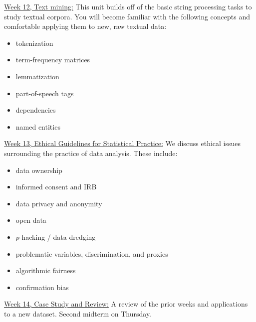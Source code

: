 \documentclass[12pt]{article}
\begin{document}
\bigskip

\underline{Week 12, Text mining:}
This unit builds off of the basic string processing tasks to study
textual corpora. You will become familiar with the following concepts
and comfortable applying them to new, raw textual data:
\begin{itemize}\setlength\itemsep{0em}
\item tokenization
\item term-frequency matrices
\item lemmatization
\item part-of-speech tags
\item dependencies
\item named entities
\end{itemize}

\bigskip

\underline{Week 13, Ethical Guidelines for Statistical Practice:}
We discuss ethical issues surrounding the practice of data analysis.
These include:
\begin{itemize}\setlength\itemsep{0em}
\item data ownership
\item informed consent and IRB
\item data privacy and anonymity
\item open data
\item $p$-hacking / data dredging
\item problematic variables, discrimination, and proxies
\item algorithmic fairness
\item confirmation bias
\end{itemize}

\bigskip

\underline{Week 14, Case Study and Review:}
A review of the prior weeks and applications to a
new dataset. Second midterm on Thursday.
\end{document}
